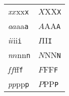 \documentclass[20pt]{rntz}
\begin{document}
\Huge

\begin{tabular}{ll}
  \textit{x}$x$x\textsf{x}\texttt{x} & $X$X\textsf{X}\texttt{X}
  \\
  \textit{a}$a$a\textsf{a}\texttt{a} & $A$A\textsf{A}\texttt{A}
  \\
  \textit{i}$i$i\textsf{i}\texttt{i} & $I$I\textsf{I}\texttt{I}
  \\
  \textit{n}$n$n\textsf{n}\texttt{n} & $N$N\textsf{N}\texttt{N}
  \\
  \textit{f}$f$f\textsf{f}\texttt{f} & $F$F\textsf{F}\texttt{F}
  \\
  \textit{p}$p$p\textsf{p}\texttt{p} & $P$P\textsf{P}\texttt{P}
\end{tabular}
\end{document}
